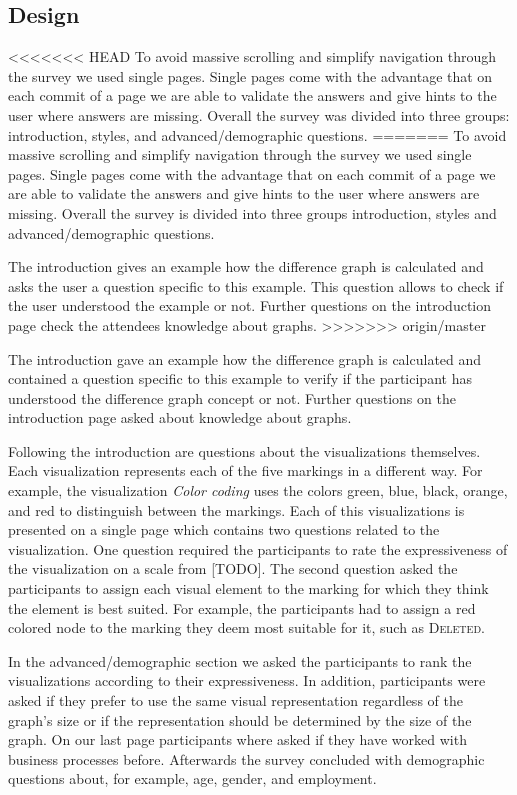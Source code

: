 \documentclass{llncs}
\begin{document}
\begin{keywords}
\subsection{Design} %
\label{sec:Design}
<<<<<<< HEAD
To avoid massive scrolling and simplify navigation through the survey we used single pages. Single pages come with the advantage that on each commit of a page we are able to validate the answers and give hints to the user where answers are missing. Overall the survey was divided into three groups: introduction, styles, and advanced/demographic questions.
=======
To avoid massive scrolling and simplify navigation through the survey we used single pages. Single pages come with the advantage that on each commit of a page we are able to validate the answers and give hints to the user where answers are missing. Overall the survey is divided into three groups introduction, styles and advanced/demographic questions.

The introduction gives an example how the difference graph is calculated and asks the user a question specific to this example. This question allows to check if the user understood the example or not. Further questions on the introduction page check the attendees knowledge about graphs.
>>>>>>> origin/master

The introduction gave an example how the difference graph is calculated and contained a question specific to this example to verify if the participant has understood the difference graph concept or not. Further questions on the introduction page asked about knowledge about graphs.  

Following the introduction are questions about the visualizations themselves. Each visualization represents each of the five markings in a different way. For example, the visualization \emph{Color coding} uses the colors green, blue, black, orange, and red to distinguish between the markings. Each of this visualizations is presented on a single page which contains two questions related to the visualization. One question required the participants to rate the expressiveness of the visualization on a scale from [TODO]. The second question asked the participants to assign each visual element to the marking for which they think the element is best suited. For example, the participants had to assign a red colored node to the marking they deem most suitable for it, such as \textsc{Deleted}.

In the advanced/demographic section we asked the participants to rank the visualizations according to their expressiveness. In addition, participants were asked if they prefer to use the same visual representation regardless of the graph's size or if the representation should be determined by the size of the graph. On our last page participants where asked if they have worked with business processes before. Afterwards the survey concluded with demographic questions about, for example, age, gender, and employment. 


\end{keywords}
\end{document}
